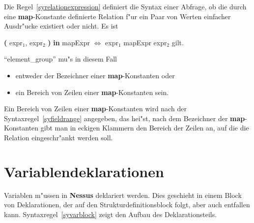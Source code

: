 \label{mapcond} Die Regel~\ref{syrelationexpression} definiert die
Syntax einer Abfrage, ob die durch eine {\bf map}-Konstante
 
  definierte
Relation f"ur ein Paar von Werten einfacher Ausdr"ucke existiert oder
nicht. Es ist

\centerline{{\bf (} expr$_{1}$, expr$_{2}$ {\bf )} {\bf in} mapExpr $\Longleftrightarrow$ expr$_{1}$ mapExpr
expr$_{2}$ gilt.} 

``element\_group'' mu"s in diesem Fall 

\begin{itemize}
  \item entweder der Bezeichner einer {\bf map}-Konstanten oder
  \item ein Bereich von Zeilen einer {\bf map}-Konstanten sein.
\end{itemize}

Ein Bereich von Zeilen einer
{\bf map}-Konstanten 
 wird nach der
Syntaxregel~\ref{syfieldrange} angegeben, das hei"st, nach dem
Bezeichner der {\bf map}-Konstanten gibt man in eckigen
Klammern den Bereich der Zeilen an, auf die die
Relation eingeschr"ankt werden soll.


\section{Variablendeklarationen}
\label{Variablendeklaration}
\label{Variablendeklarationen}

Variablen m"ussen in {\bf Nessus} deklariert werden.
Dies geschieht in einem Block von Deklarationen, der auf den
Strukturdefinitionsblock folgt, aber auch
entfallen kann.  Syntaxregel~\ref{syvarblock} zeigt den Aufbau des
Deklarationsteils.

